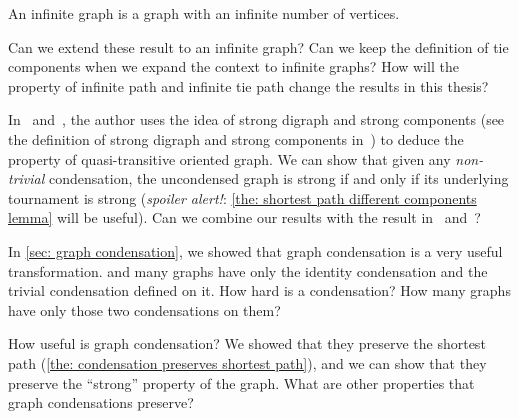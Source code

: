 \begin{definition}
  An infinite graph is a graph with an infinite number of vertices.
\end{definition}

Can we extend these result to an infinite graph?
Can we keep the definition of tie components when
we expand the context to infinite graphs?
How will the property of infinite path
and infinite tie path change the results in this thesis?

In~\cite{bang-jensen_kings_1998}
and~\cite{bangjensen_quasitransitive_1995},
the author uses the idea of strong digraph and strong components
(see the definition of strong digraph and strong components
in~\cite{west_introduction_2001})
to deduce the property of quasi-transitive oriented graph.
We can show that given any \emph{non-trivial} condensation,
the uncondensed graph is strong
if and only if its underlying tournament is strong
(\emph{spoiler alert!}:
\cref{the: shortest path different components lemma} will be useful).
Can we combine our results with the result
in~\cite{bang-jensen_kings_1998} and~\cite{bangjensen_quasitransitive_1995}?

In \cref{sec: graph condensation},
we showed that graph condensation is a very useful transformation.
and many graphs have only the identity condensation
and the trivial condensation defined on it.
How hard is a condensation?
How many graphs have only those two condensations on them? 

How useful is graph condensation?
We showed that they preserve the shortest path
(\cref{the: condensation preserves shortest path}),
and we can show that they preserve the ``strong'' property of the graph.
What are other properties that graph condensations preserve?
